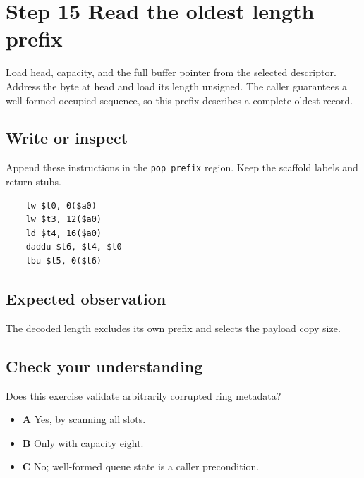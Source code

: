\section{Step 15 Read the oldest length prefix}\label{ring-s15}

Load head, capacity, and the full buffer pointer from the selected descriptor. Address the byte at head and load its length unsigned. The caller guarantees a well-formed occupied sequence, so this prefix describes a complete oldest record.

\subsection{Write or inspect}
Append these instructions in the \texttt{pop\_prefix} region. Keep the scaffold labels and return stubs.

\begin{verbatim}
    lw $t0, 0($a0)
    lw $t3, 12($a0)
    ld $t4, 16($a0)
    daddu $t6, $t4, $t0
    lbu $t5, 0($t6)
\end{verbatim}

\subsection{Expected observation}
The decoded length excludes its own prefix and selects the payload copy size.

\subsection{Check your understanding}
Does this exercise validate arbitrarily corrupted ring metadata?

\begin{itemize}
  \item \textbf{A} Yes, by scanning all slots.
  \item \textbf{B} Only with capacity eight.
  \item \textbf{C} No; well-formed queue state is a caller precondition.
\end{itemize}
